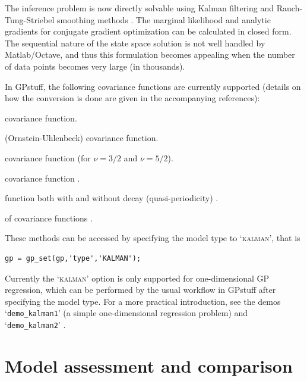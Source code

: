\documentclass[twoside,11pt]{article}
\newcommand{\pkg}[1]{{\fontseries{b}\selectfont #1}}
\newcommand{\code}[1]{{\normalfont\texttt{#1}}}
\begin{document}
The inference problem is now directly solvable using Kalman filtering and
Rauch-Tung-Striebel smoothing methods \citep{Grewal+Andrews:2001, Sarkka:2013}.
The marginal likelihood and analytic gradients for conjugate gradient
optimization can be calculated in closed form. The sequential nature of the
state space solution is not well handled by Matlab/Octave, and thus this
formulation becomes appealing when the number of data points becomes very large
(in thousands).

In \pkg{GPstuff}, the following covariance functions are currently supported
(details on how the conversion is done are given in the accompanying
references):
%
\begin{description}[labelindent=\parindent]
  \item[Constant] 
    covariance function.
  \item[Exponential] 
    (Ornstein-Uhlenbeck) covariance function.
  \item[Mat\'ern] 
    covariance function (for $\nu=3/2$ and $\nu=5/2$).
  \item[Squared exponential] 
    covariance function \citep[as presented in][]{Hartikainen+Sarkka:2010}.
  \item[Periodic covariance] 
    function both with and without decay (quasi-periodicity) 
    \citep[as presented in][]{Solin+Sarkka:2014}.
  \item[Sums and products] 
    of covariance functions \citep[as given in][]{Solin+Sarkka:2014}.
\end{description}
%
These methods can be accessed by specifying the model type to 
`\textsc{kalman}', that is
%
\begin{verbatim}
gp = gp_set(gp,'type','KALMAN');
\end{verbatim}
%
Currently the `\textsc{kalman}' option is only supported for one-dimensional GP
regression, which can be performed by the usual workflow in \pkg{GPstuff}
after specifying the model type. For a more practical introduction, see the
demos `\code{demo\_kalman1}' (a simple one-dimensional regression problem) and
`\code{demo\_kalman2}' \citep[periodic modeling of the Mauna Loa $\text{CO}_2$
data, following][]{Solin+Sarkka:2014}.







\section{Model assessment and comparison}\label{sec:model_assessment}
\end{document}
